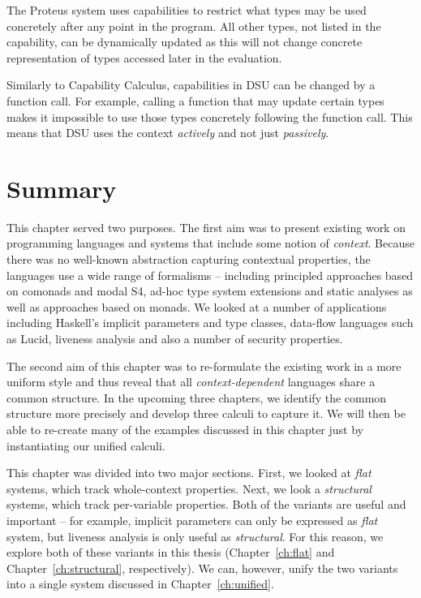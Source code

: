 The Proteus system uses capabilities to restrict what types may be used concretely after any point
in the program. All other types, not listed in the capability, can be dynamically updated as this
will not change concrete representation of types accessed later in the evaluation.

Similarly to Capability Calculus, capabilities in DSU can be changed by a function call. For 
example, calling a function that may update certain types makes it impossible to use those types
concretely following the function call. This means that DSU uses the context \emph{actively}
and not just \emph{passively}.


\section{Summary}

This chapter served two purposes. The first aim was to present existing work on programming 
languages and systems that include some notion of \emph{context}. Because there was no well-known
abstraction capturing contextual properties, the languages use a wide range of formalisms -- including
principled approaches based on comonads and modal S4, ad-hoc type system extensions and static analyses 
as well as approaches based on monads. We looked at a number of applications including Haskell's implicit 
parameters and type classes, data-flow languages such as Lucid, liveness analysis and also a number of 
security properties. 

The second aim of this chapter was to re-formulate the existing work in a more uniform style and thus
reveal that all \emph{context-dependent} languages share a common structure. In the upcoming three 
chapters, we identify the common structure more precisely and develop three calculi to capture it. We 
will then be able to re-create many of the examples discussed in this chapter just by instantiating our 
unified calculi.

This chapter was divided into two major sections. First, we looked at \emph{flat} systems, which
track whole-context properties. Next, we look a \emph{structural} systems, which track per-variable
properties. Both of the variants are useful and important -- for example, implicit parameters can
only be expressed as \emph{flat} system, but liveness analysis is only useful as \emph{structural}.
For this reason, we explore both of these variants in this thesis (Chapter~\ref{ch:flat} and 
Chapter~\ref{ch:structural}, respectively). We can, however, unify the two variants into a single
system discussed in Chapter~\ref{ch:unified}.
